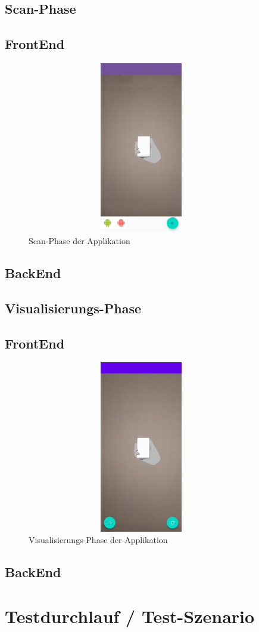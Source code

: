 \subsection{Scan-Phase} %
\subsection*{FrontEnd}
\begin{figure}[hbt!]
    \centering
    \includegraphics[width=10cm,height=7.5cm,keepaspectratio]{4Umsetzung/Bilder/scan-phase.jpg}
    \caption{Scan-Phase der Applikation}
    \label{pic:scan}
\end{figure}
\subsection*{BackEnd}

\subsection{Visualisierungs-Phase} 
\subsection*{FrontEnd}
\begin{figure}[hbt!]
    \centering
    \includegraphics[width=10cm,height=7.5cm,keepaspectratio]{4Umsetzung/Bilder/visual-phase.jpg}
    \caption{Visualisierungs-Phase der Applikation}
    \label{pic:visual}
\end{figure}
\subsection*{BackEnd}

\section{Testdurchlauf / Test-Szenario}
\label{chap:testdurchlauf}